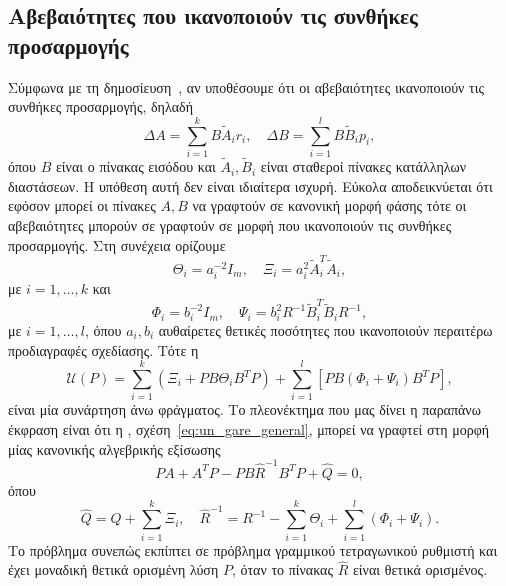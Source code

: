 \subsection{Αβεβαιότητες που ικανοποιούν τις συνθήκες προσαρμογής}
Σύμφωνα με τη δημοσίευση~\cite{barmish1983}, αν υποθέσουμε ότι οι αβεβαιότητες
ικανοποιούν τις συνθήκες προσαρμογής, δηλαδή
\[
    \Delta A = \sum_{i = 1}^k B\tilde{A}_ir_i, \quad
    \Delta B = \sum_{i = 1}^l B\tilde{B}_ip_i,
\]
όπου \( B \) είναι ο πίνακας εισόδου και \( \tilde{A}_i, \tilde{B}_i \) είναι
σταθεροί πίνακες κατάλληλων διαστάσεων. Η υπόθεση αυτή δεν είναι ιδιαίτερα
ισχυρή. Εύκολα αποδεικνύεται ότι εφόσον μπορεί οι πίνακες \( A, B \) να γραφτούν
σε κανονική μορφή φάσης τότε οι αβεβαιότητες μπορούν σε γραφτούν σε μορφή που
ικανοποιούν τις συνθήκες προσαρμογής. Στη συνέχεια ορίζουμε
\[
    \Theta_i = a_i^{-2}I_m, \quad
    \Xi_i = a_i^2\tilde{A}^T_i\tilde{A}_i,
\]
με \( i = 1, \dots, k \) και
\[
    \Phi_i = b_i^{-2}I_m,\quad
    \Psi_i = b_i^2R^{-1}\tilde{B}_i^T\tilde{B}_iR^{-1},
\]
με \( i = 1, \dots, l \), όπου \( a_i, b_i \) αυθαίρετες θετικές ποσότητες που
ικανοποιούν περαιτέρω προδιαγραφές σχεδίασης. Τότε η
\[
    \mathcal{U}(P) = \sum_{i = 1}^k\left( \Xi_i + PB\Theta_iB^TP \right)
    + \sum_{i = 1}^l\left[ PB\left( \Phi_i + \Psi_i\right)B^TP \right],
\]
είναι μία συνάρτηση άνω φράγματος. Το πλεονέκτημα που μας δίνει η παραπάνω
έκφραση είναι ότι η , σχέση~\eqref{eq:un_gare_general}, μπορεί να
γραφτεί στη μορφή μίας κανονικής αλγεβρικής εξίσωσης 
\begin{equation}\label{eq:gcc_quad_ric}
    PA + A^TP - PB\hat{R}^{-1}B^TP + \hat{Q} = 0,
\end{equation}
όπου
\begin{equation}\label{eq:gcc_quad}
    \hat{Q} = Q + \sum_{i = 1}^k\Xi_i, \quad
    \hat{R}^{-1} = R^{-1} - \sum_{i = 1}^k\Theta_i +
    \sum_{i = 1}^l\left( \Phi_i + \Psi_i \right).
\end{equation}
Το πρόβλημα συνεπώς εκπίπτει σε πρόβλημα γραμμικού τετραγωνικού ρυθμιστή και
έχει μοναδική θετικά ορισμένη λύση \( P \), όταν το πίνακας \( \hat{R} \) είναι
θετικά ορισμένος.

